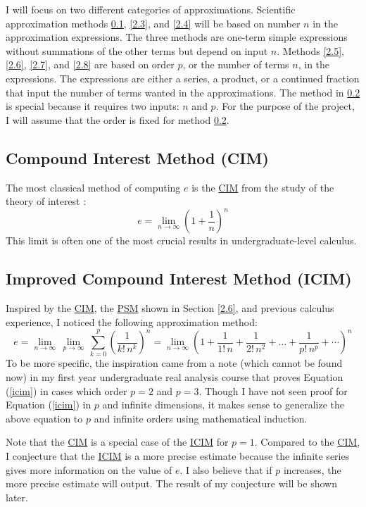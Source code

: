 \documentclass[11pt]{article}
\begin{document}
I will focus on two different categories of approximations. Scientific approximation methods \ref{2.1}, \ref{2.3}, and \ref{2.4} will be based on number $n$ in the approximation expressions. The three methods are one-term simple expressions without summations of the other terms but depend on input $n$. Methods \ref{2.5}, \ref{2.6}, \ref{2.7}, and \ref{2.8} are based on order $p$, or the number of terms $n$, in the expressions. The expressions are either a series, a product, or a continued fraction that input the number of terms wanted in the approximations. The method in \ref{2.2} is special because it requires two inputs: $n$ and $p$. For the purpose of the project, I will assume that the order is fixed for method \ref{2.2}.

\subsection{Compound Interest Method (CIM)}\label{2.1}
The most classical method of computing $e$ is the \hyperref[2.1]{CIM} from the study of the theory of interest \cite{bk:iyanaga_kawada}: 
\begin{equation}
e=\lim_{n\to\infty} \left(1+\frac{1}{n}\right)^n
\end{equation}
This limit is often one of the most crucial results in undergraduate-level calculus.  

\subsection{Improved Compound Interest Method (ICIM)}\label{2.2}
Inspired by the \hyperref[2.1]{CIM}, the \hyperref[2.6]{PSM} shown in Section \ref{2.6}, and previous calculus experience, I noticed the following approximation method: 
\begin{equation}\label{icim}
e=\lim_{n\to\infty}\,\lim_{p\to\infty}\,\sum_{k=0}^{p} \left(\frac{1}{k!\,n^{k}}\right)^{n}=\lim_{n\to\infty} \left(1+\frac{1}{1!\,n}+\frac{1}{2!\,n^{2}}+\dots+\frac{1}{p!\,n^{p}}+\cdots\right)^{n}
\end{equation}
To be more specific, the inspiration came from a note (which cannot be found now) in my first year undergraduate real analysis course that proves Equation (\ref{icim}) in cases which order $p=2$ and $p=3$. Though I have not seen proof for Equation (\ref{icim}) in $p$ and infinite dimensions, it makes sense to generalize the above equation to $p$ and infinite orders using mathematical induction.

Note that the \hyperref[2.1]{CIM} is a special case of the \hyperref[2.2]{ICIM} for $p=1$. Compared to the \hyperref[2.1]{CIM}, I conjecture that the \hyperref[2.2]{ICIM} is a more precise estimate because the infinite series gives more information on the value of $e$. I also believe that if $p$ increases, the more precise estimate will output. The result of my conjecture will be shown later.
\end{document}
